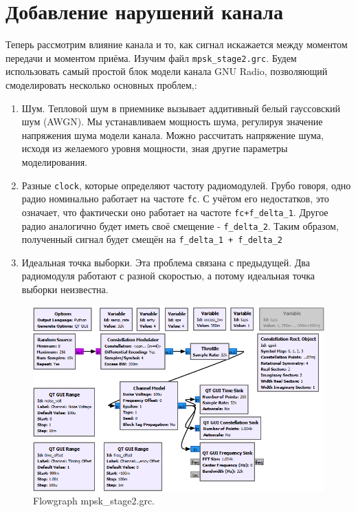 \documentclass[a4paper, 14pt]{extarticle}
\begin{document}
    \section{Добавление нарушений канала}
    \label{sec:task2}

    Теперь рассмотрим влияние канала и то, как сигнал искажается между моментом передачи и моментом приёма.
    Изучим файл \texttt{mpsk\_stage2.grc}.
    Будем использовать самый простой блок модели канала GNU Radio, позволяющий смоделировать несколько основных проблем,:

    \begin{enumerate}
        \item Шум.
        Тепловой шум в приемнике вызывает аддитивный белый гауссовский шум (AWGN).
        Мы устанавливаем мощность шума, регулируя значение напряжения шума модели канала.
        Можно рассчитать напряжение шума, исходя из желаемого уровня мощности, зная другие параметры моделирования.
        \item Разные \texttt{clock}, которые определяют частоту радиомодулей.
        Грубо говоря, одно радио номинально работает на частоте \texttt{fc}.
        С учётом его недостатков, это означает, что фактически оно работает на частоте \texttt{fc+f\_delta\_1}.
        Другое радио аналогично будет иметь своё смещение - \texttt{f\_delta\_2}.
        Таким образом, полученный сигнал будет смещён на \texttt{f\_delta\_1 + f\_delta\_2}
        \item Идеальная точка выборки.
        Эта проблема связана с предыдущей.
        Два радиомодуля работают с разной скоростью, а потому идеальная точка выборки неизвестна.
    \end{enumerate}

    \begin{figure}[h]
        \centering
        \includegraphics[width=0.8\linewidth]{resources/Images/task2_mpsk_stage2}
        \caption{Flowgraph mpsk\_stage2.grc.}
        \label{fig:task2_mpsk_stage2}
    \end{figure}
\end{document}
